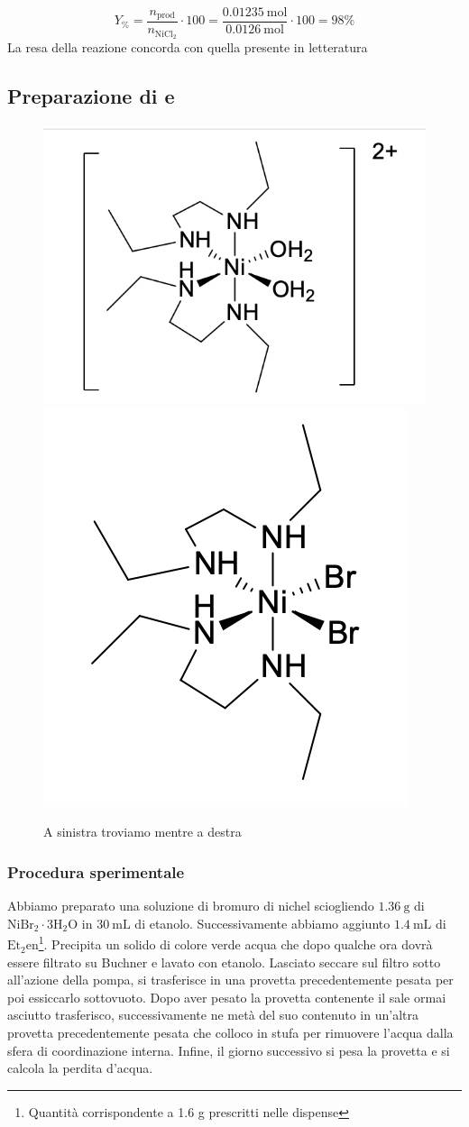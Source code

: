 $$Y_\% = \frac{n_\text{prod}}{n_{\mathrm{NiCl}_2}}\cdot 100 = \frac{0.01235 \mathrm{~mol}}{0.0126 \mathrm{~mol}} \cdot 100 =98 \%
$$
La resa della reazione concorda con quella presente in letteratura \cite{support}
\subsection{Preparazione di  e \ce{[Ni(Et2en)2Br2]}}
\begin{figure}[ht!]
    \centering
    \includegraphics[width=0.4\linewidth]{foto/nieten2.png}
    \includegraphics[width=0.265\linewidth]{foto/nietenbr2.png}
    \caption{A sinistra troviamo  mentre a destra \ce{[Ni(Et2en)2Br2]} }
    \label{fig:nieten}
\end{figure}



\subsubsection{Procedura sperimentale}

Abbiamo preparato una soluzione di bromuro di nichel sciogliendo $1.36 \mathrm{~g}$ di $\mathrm{NiBr}_2 \cdot 3 \mathrm{H}_2 \mathrm{O}$ in $30 \mathrm{~mL}$ di etanolo. Successivamente abbiamo aggiunto  $1.4 \mathrm{~mL}$ di $\mathrm{Et}_2 \mathrm{en}$\footnote{ Quantità corrispondente a 1.6 g prescritti nelle dispense}. Precipita un solido di colore verde acqua che dopo qualche ora dovrà essere filtrato su Buchner e lavato con etanolo. Lasciato seccare sul filtro sotto all'azione della pompa, si trasferisce in una provetta precedentemente pesata per poi essiccarlo sottovuoto. Dopo aver pesato la provetta contenente il sale ormai asciutto trasferisco, successivamente ne metà del suo contenuto in un'altra provetta precedentemente pesata che colloco in stufa per rimuovere l'acqua dalla sfera di coordinazione interna. Infine, il giorno successivo si pesa la provetta e si calcola la perdita d'acqua.

